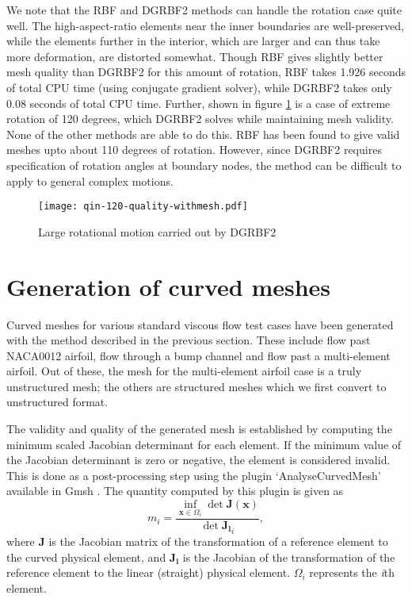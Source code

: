  We note that the RBF and DGRBF2 methods can handle the rotation case quite well. The high-aspect-ratio elements near the inner boundaries are well-preserved, while the elements further in the interior, which are larger and can thus take more deformation, are distorted somewhat. Though RBF gives slightly better mesh quality than DGRBF2 for this amount of rotation, RBF takes 1.926 seconds of total CPU time (using conjugate gradient solver), while DGRBF2 takes only 0.08 seconds of total CPU time. Further, shown in figure \ref{fig:qin-dgrbf2-120} is a case of extreme rotation of 120 degrees, which DGRBF2 solves while maintaining mesh validity. None of the other methods are able to do this. RBF has been found to give valid meshes upto about 110 degrees of rotation. However, since DGRBF2 requires specification of rotation angles at boundary nodes, the method can be difficult to apply to general complex motions.
 
 \begin{figure}
 	\centering
 	\texttt{[image: qin-120-quality-withmesh.pdf]}
 	\caption{Large rotational motion carried out by DGRBF2}
 	\label{fig:qin-dgrbf2-120}
 \end{figure}
 
 \FloatBarrier
 
 \section{Generation of curved meshes}
 
 Curved meshes for various standard viscous flow test cases have been generated with the method described in the previous section. These include flow past NACA0012 airfoil, flow through a bump channel and flow past a multi-element airfoil. Out of these, the mesh for the multi-element airfoil case is a truly unstructured mesh; the others are structured meshes which we first convert to unstructured format.
 
 The validity and quality of the generated mesh is established by computing the minimum scaled Jacobian determinant for each element. If the minimum value of the Jacobian determinant is zero or negative, the element is considered invalid. This is done as a post-processing step using the plugin `AnalyseCurvedMesh' available in Gmsh \cite{gmsh}. The quantity computed by this plugin is given as
 \begin{equation} 
 m_i = \frac{\inf_{\mathbf{x}\in\Omega_i}\det \mathbf{J}(\mathbf{x})}{\det \mathbf{J_l}_i},
 \end{equation}
 where $\mathbf{J}$ is the Jacobian matrix of the transformation of a reference element to the curved physical element, and $\mathbf{J_l}$ is the Jacobian of the transformation of the reference element to the linear (straight) physical element. $\Omega_i$ represents the \emph{i}th element.
 

